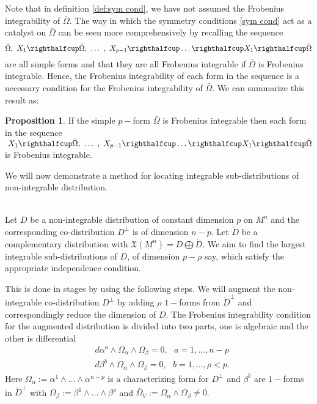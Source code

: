 \documentclass[a4paper, 11pt]{amsart}
\theoremstyle{definition}
\newtheorem{proposition}[theorem]{Proposition}
\begin{document}
Note that in definition \ref{def:sym cond}, we have not assumed the Frobenius integrability of $\bar{\Omega}.$ The way in which the symmetry conditions \eqref{sym cond} act as a catalyst  on $\bar{\Omega}$ can be seen more comprehensively by recalling the sequence \[\bar{\Omega},\ X_1 \righthalfcup \bar{\Omega},\ \dots\ ,\ X_{p-1}\righthalfcup\dots\righthalfcup X_1\righthalfcup \bar{\Omega}\]
are all simple forms and that they are all Frobenius integrable if $\bar\Omega$ is Frobenius integrable. Hence, the Frobenius integrability of each form in the sequence is a necessary condition for the Frobenius integrability of $\bar\Omega$. We can summarize this result as:
\begin{proposition}\label{prop:FI of p form}
If the simple $p-$form $\bar\Omega$ is Frobenius integrable then each form in the sequence
$\ X_1 \righthalfcup \bar\Omega,\ \dots\ ,\ X_{p-1}\righthalfcup\dots\righthalfcup X_1\righthalfcup \bar\Omega$
is Frobenius integrable.
\end{proposition}

 We will now demonstrate a method for locating integrable sub-distributions of non-integrable distribution.

\\
Let $D$ be a non-integrable distribution of constant dimension $p$ on $M^n$ and the corresponding co-distribution $D^\perp$ is of dimension $n-p.$ Let $\acute{D}$ be a complementary distribution with ${\mathfrak{X}}(M^n)=D\bigoplus \acute{D}.$ We aim to find the largest integrable sub-distributions of $D$, of dimension $p-\rho$ say, which satisfy the appropriate independence condition.

This is done in stages by using the following steps. We will augment the non-integrable co-distribution $D^\perp$ by adding $\rho$ $1-$forms from $\acute{D}^{\perp}$ and correspondingly reduce the dimension of $D.$ The Frobenius integrability condition for the augmented distribution is divided into two parts, one is  algebraic and the other is differential
 \begin{align}&d\alpha^a\wedge\Omega_\alpha\wedge\Omega_\beta=0, \ \ \ a=1,\ldots, n-p\label{eqn:FI1}\\
&d\beta^b \wedge\Omega_\alpha\wedge\Omega_\beta=0, \ \ \ b =1,\ldots, \rho< p.\label{eqn:FI2}\end{align}
Here $\Omega_{\alpha}:=\alpha^1\wedge\ldots\wedge\alpha^{n-p}$ is a characterizing form for $D^\perp$ and $\beta^b$  are $1-$forms in $\acute{D}^{\perp}$ with $\Omega_\beta:=\beta^1\wedge\dots\wedge\beta^\rho$ and $\bar{\Omega}_V:=\Omega_\alpha\wedge \Omega_\beta\neq 0.$\\
\end{document}
